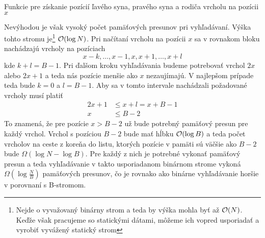 \begin{algorithm}[H]
	\caption{Funkcie pre získanie pozícií ľavého syna, pravého syna a rodiča vrcholu na pozícii $x$}
    \label{alg:naive_indexing}
	\begin{minipage}[t]{0.3\textwidth}
	    \begin{algorithmic}[1]
	            \State {}
	        \EndFunction
	    \end{algorithmic}
	\end{minipage} \hfill
	\begin{minipage}[t]{0.3\textwidth}
	    \begin{algorithmic}[1]
	            \State {}
	        \EndFunction
	    \end{algorithmic}
	\end{minipage} \hfill
	\begin{minipage}[t]{0.3\textwidth}
	    \begin{algorithmic}[1]
	            \State {}
	        \EndFunction
	    \end{algorithmic}
	\end{minipage}
\end{algorithm}

Nevýhodou je však vysoký počet pamäťových presunov pri vyhľadávaní. Výška tohto stromu je\footnote{Nejde o vyvažovaný binárny strom a teda by výška mohla byť až $\mathcal{O}(N)$. Keďže však pracujeme so statickými dátami, môžeme ich vopred usporiadať a vyrobiť vyvážený statický strom} $\mathcal{O}(\log{N})$. Pri načítaní vrcholu na pozícii $x$ sa v rovnakom bloku nachádzajú vrcholy na pozíciach
\[
x-k,\dotsc,x-1,x,x+1,\dotsc,x+l
\]
kde $k+l=B-1$. Pri ďalšom kroku vyhľadávania budeme potrebovať vrchol $2x$ alebo $2x+1$ a teda nás pozície menšie ako $x$ nezaujímajú. V najlepšom prípade teda bude $k=0$ a $l=B-1$. Aby sa v tomto intervale nachádzali požadované vrcholy musí platiť
\[
\begin{aligned}
2x+1 &\le x+l = x+B-1 \\
x &\le B-2
\end{aligned}
\]
To znamená, že pre pozície $x > B - 2$ už bude potrebný pamäťový presun pre každý vrchol. Vrchol s pozíciou $B-2$ bude mať hĺbku $\mathcal{O}(\log{B})$ a teda počet vrcholov na ceste z koreňa do listu, ktorých pozície v pamäti sú väčšie ako $B-2$ bude $\Omega(\log{N}-\log{B})$. Pre každý z nich je potrebné vykonať pamäťový presun a teda vyhľadávanie v takto usporiadanom binárnom strome vykoná $\Omega(\log{\frac{N}{B}})$ pamäťových presunov, čo je rovnako ako binárne vyhľadávanie horšie v porovnaní s \aware B-stromom.

